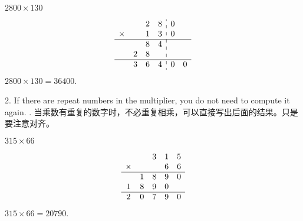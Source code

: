 \begin{example}
$2800\times 130$
\end{example}
\begin{solution}
$$
\begin{array}{cccc:cc}
&&2&8&0&\\
\times&&1&3&0&\\
\hline
&&8&4&&\\
&2&8&&&\\
\hline
&3&6&4&0&0\\
\end{array}
$$
$2800\times 130=36400$.
\end{solution}

\begin{paracol}{2}
2. If there are repeat numbers in the multiplier, you do not need to compute it again. 
. 当乘数有重复的数字时，不必重复相乘，可以直接写出后面的结果。只是要注意对齐。
\end{paracol}
\begin{example}
$315\times 66$
\end{example}
\begin{solution}
$$
\begin{array}{ccccc}
&&3&1&5\\
\times&&&6&6\\
\hline
&1&8&9&0\\
1&8&9&0&\\
\hline
2&0&7&9&0\\
\end{array}
$$
$315\times 66=20790$.
\end{solution}
   \newpage